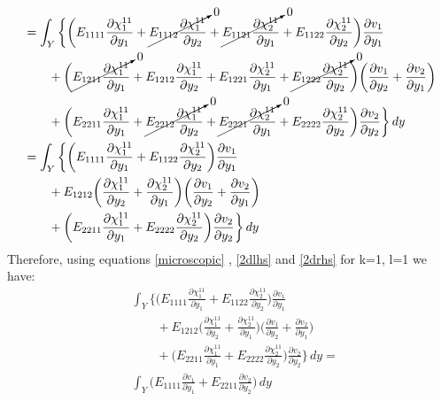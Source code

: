 \documentclass[10pt]{article}
\begin{document}
\begin{equation}
\begin{split}
&=\int_Y \bigg \{\bigg ( E_{1111}\frac{\partial \chi^{11}_1}{\partial y_1} + \cancelto{0}{E_{1112}\frac{\partial \chi^{11}_1}{\partial y_2}} + 
\cancelto{0}{E_{1121}\frac{\partial \chi^{11}_2}{\partial y_1}} + 
E_{1122}\frac{\partial \chi^{11}_2}{\partial y_2}\bigg )\frac{\partial v_1}{\partial y_1}\\
&\qquad + \bigg (\cancelto{0}{E_{1211}\frac{\partial \chi^{11}_1}{\partial y_1}} + E_{1212}\frac{\partial \chi^{11}_1}{\partial y_2} + E_{1221}\frac{\partial \chi^{11}_2}{\partial y_1} + \cancelto{0}{E_{1222}\frac{\partial \chi^{11}_2}{\partial y_2}}\bigg )\bigg (\frac{\partial v_1}{\partial y_2} +\frac{\partial v_2}{\partial y_1}\bigg )\\
&\qquad + \bigg (E_{2211}\frac{\partial \chi^{11}_1}{\partial y_1} + \cancelto{0}{E_{2212}\frac{\partial \chi^{11}_1}{\partial y_2}} + \cancelto{0}{E_{2221}\frac{\partial \chi^{11}_2}{\partial y_1}} + E_{2222}\frac{\partial \chi^{11}_2}{\partial y_2}\bigg )\frac{\partial v_2}{\partial y_2}\bigg \}\,dy\\
&=\int_Y \bigg \{\bigg ( E_{1111}\frac{\partial \chi^{11}_1}{\partial y_1} + E_{1122}\frac{\partial \chi^{11}_2}{\partial y_2}\bigg )\frac{\partial v_1}{\partial y_1}\\
&\qquad + E_{1212}\bigg (\frac{\partial \chi^{11}_1}{\partial y_2} + \frac{\partial \chi^{11}_2}{\partial y_1}\bigg )\bigg (\frac{\partial v_1}{\partial y_2} +\frac{\partial v_2}{\partial y_1}\bigg )\\
&\qquad + \bigg (E_{2211}\frac{\partial \chi^{11}_1}{\partial y_1} + E_{2222}\frac{\partial \chi^{11}_2}{\partial y_2}\bigg )\frac{\partial v_2}{\partial y_2}\bigg \}\,dy\\
\end{split}
\end{equation}
Therefore, using equations \eqref{microscopic} , \eqref{2dlhs} and \eqref{2drhs} for k=1, l=1 we have:
\begin{equation}
\begin{split}
&\int_Y \bigg \{\bigg ( E_{1111}\frac{\partial \chi^{11}_1}{\partial y_1} + E_{1122}\frac{\partial \chi^{11}_2}{\partial y_2}\bigg )\frac{\partial v_1}{\partial y_1}\\
&\qquad + E_{1212}\bigg (\frac{\partial \chi^{11}_1}{\partial y_2} + \frac{\partial \chi^{11}_2}{\partial y_1}\bigg )\bigg (\frac{\partial v_1}{\partial y_2} +\frac{\partial v_2}{\partial y_1}\bigg )\\
&\qquad + \bigg (E_{2211}\frac{\partial \chi^{11}_1}{\partial y_1} + E_{2222}\frac{\partial \chi^{11}_2}{\partial y_2}\bigg )\frac{\partial v_2}{\partial y_2}\bigg \}\,dy = \\
&\int_Y\bigg (E_{1111}\frac{\partial v_1}{\partial y_1}+E_{2211}\frac{\partial v_2}{\partial y_2}\bigg )\, dy
\end{split}
\end{equation}
\end{document}

